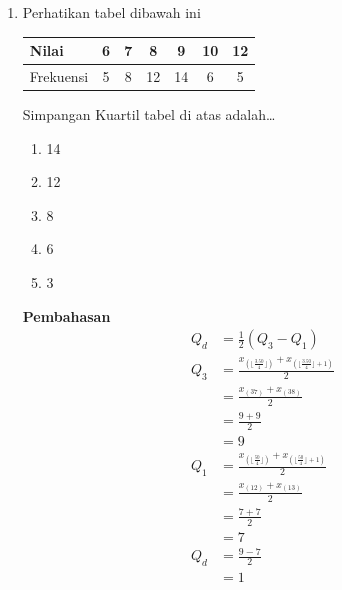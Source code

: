 \documentclass{report}
\newcommand{\options}[5]{
\begin{enumerate}[label=\alph*.]
	\item #1
	\item #2
	\item #3
	\item #4
	\item #5
\end{enumerate}
}
\newcommand{\pemb}{ \textbf{Pembahasan} \\}
\begin{document}
\begin{enumerate}
\item Perhatikan tabel dibawah ini\\
\begin{center}
\begin{tabular}{|l|c|c|c|c|c|c|}
	\hline
	Nilai & 6 & 7 & 8 & 9 & 10 & 12 \\
	\hline
	Frekuensi & 5 & 8 & 12 & 14 & 6 & 5 \\
	\hline
\end{tabular}
\end{center}
Simpangan Kuartil tabel di atas adalah\ldots
\options
{14}
{12}
{8}
{6}
{3}
\pemb
\begin{align*}
	Q_{d}&=\frac{1}{2}(Q_3-Q_1) \\
	Q_{3}
	&=\frac{x_{\left(\lfloor \frac{3.50}{4} \rfloor \right)}+x_{\left( \lfloor \frac{3.50}{4} \rfloor +1\right)}}{2}\\
	&=\frac{x_{(37)}+x_{(38)}}{2}\\
	&=\frac{9+9}{2}\\
	&=9\\
	Q_{1}
	&=\frac{x_{\left(\lfloor \frac{50}{4} \rfloor \right)}+x_{\left(\lfloor \frac{50}{4} \rfloor +1\right)}}{2}\\
	&=\frac{x_{(12)}+x_{(13)}}{2}\\
	&=\frac{7+7}{2}\\
	&=7\\
	Q_d&=\frac{9-7}{2}\\&=1
\end{align*}

	


\end{enumerate}
\end{document}
